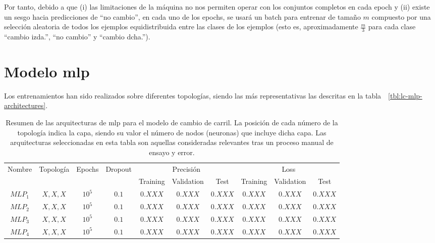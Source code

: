 Por tanto, debido a que (i) las limitaciones de la máquina no nos permiten operar con los conjuntos completos en cada epoch y (ii) existe un sesgo hacia predicciones de \enquote{no cambio}, en cada uno de los epochs, se usará un batch para entrenar de tamaño $m$ compuesto por una selección aleatoria de todos los ejemplos equidistribuida entre las clases de los ejemplos (esto es, aproximadamente $\frac{m}{3}$ para cada clase \enquote{cambio izda.}, \enquote{no cambio} y \enquote{cambio dcha.}).

\section{Modelo \ac{mlp}}

Los entrenamientos han sido realizados sobre diferentes topologías, siendo las más representativas las descritas en la tabla~~\ref{tbl:lc-mlp-architectures}.

\begin{table}
	\caption[Resumen de las arquitecturas \ac{mlp} para el modelo de cambio de carril]{Resumen de las arquitecturas de \ac{mlp} para el modelo de cambio de carril. La posición de cada número de la topología indica la capa, siendo su valor el número de nodos (neuronas) que incluye dicha capa. Las arquitecturas seleccionadas en esta tabla son aquellas consideradas relevantes tras un proceso manual de ensayo y error.}
	\label{tbl:cf-mlp-architectures}
	\begin{tabular}{cccccccccc}
		\hline
		\multirow{2}{*}{Nombre} & \multirow{2}{*}{Topología} & \multirow{2}{*}{Epochs} & \multirow{2}{*}{Dropout} & \multicolumn{3}{c}{Precisión} & \multicolumn{3}{c}{Loss}      \\
		& & & & Training & Validation & Test & Training & Validation & Test \\ \hline
		$MLP_1$ & $X, X, X$ & $10^5$ & $0.1$ & $0.XXX$ & $0.XXX$ & $0.XXX$ & $0.XXX$ & $0.XXX$ & $0.XXX$ \\
		$MLP_2$ & $X, X, X$ & $10^5$ & $0.1$ & $0.XXX$ & $0.XXX$ & $0.XXX$ & $0.XXX$ & $0.XXX$ & $0.XXX$ \\
		$MLP_3$ & $X, X, X$ & $10^5$ & $0.1$ & $0.XXX$ & $0.XXX$ & $0.XXX$ & $0.XXX$ & $0.XXX$ & $0.XXX$ \\
		$MLP_4$ & $X, X, X$ & $10^5$ & $0.1$ & $0.XXX$ & $0.XXX$ & $0.XXX$ & $0.XXX$ & $0.XXX$ & $0.XXX$ \\ \hline
	\end{tabular}
\end{table}


